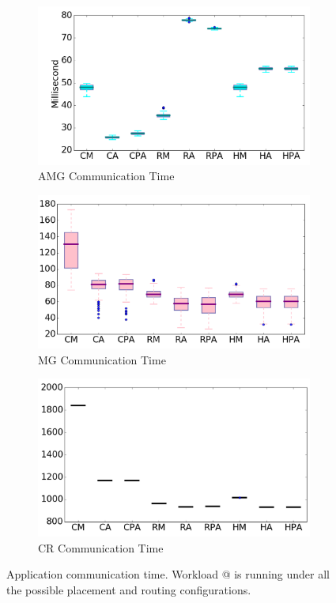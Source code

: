 \documentclass[conference,compsoc]{IEEEtran}
\makeatletter
\newcommand{\Rmnum}[1]{\expandafter\@slowromancap\romannumeral #1@}
\makeatother
\begin{document}
\begin{figure}[t!]
    \centering
    \begin{subfigure}[t]{0.32\textwidth}
        \centering
        \includegraphics[height=1.3 in]{hyb-plcmt/amg/commtime}
        \caption{AMG Communication Time}
        \label{fig:hyb-plcmt-amg-commtime}
    \end{subfigure}\hfill
    \hspace{1em}%
    \begin{subfigure}[t]{0.32\textwidth}
        \centering
        \includegraphics[height=1.3 in]{hyb-plcmt/mg/commtime}
        \caption{MG Communication Time}
        \label{fig:hyb-plcmt-mg-commtime}
    \end{subfigure}\hfill
    \begin{subfigure}[t]{0.32\textwidth}
        \centering
        \includegraphics[height=1.3 in]{hyb-plcmt/cr/commtime}
        \caption{CR Communication Time}
        \label{fig:hyb-plcmt-cr-commtime}
    \end{subfigure}%
   \caption{Application communication time. Workload \Rmnum{1} is running under all the possible placement and routing configurations.}
   \label{fig:hyb-plcmt-apps-commtime}
\end{figure}
\end{document}
